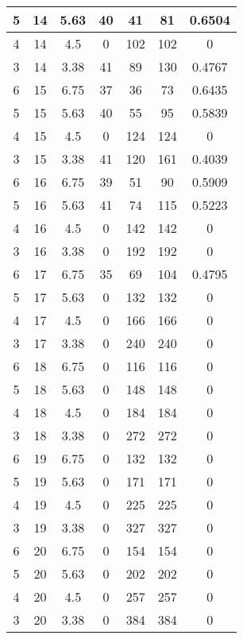 \documentclass[letterpaper, 12pt]{article}
\begin{document}
\begin{longtable}{|c|c|c|c|c|c|c|}
\hline
5 & 14 & 5.63 & 40 & 41 & 81 & 0.6504 \\
\hline
4 & 14 & 4.5 & 0 & 102 & 102 & 0 \\
\hline
3 & 14 & 3.38 & 41 & 89 & 130 & 0.4767 \\
\hline
6 & 15 & 6.75 & 37 & 36 & 73 & 0.6435 \\
\hline
5 & 15 & 5.63 & 40 & 55 & 95 & 0.5839 \\
\hline
4 & 15 & 4.5 & 0 & 124 & 124 & 0 \\
\hline
3 & 15 & 3.38 & 41 & 120 & 161 & 0.4039 \\
\hline
6 & 16 & 6.75 & 39 & 51 & 90 & 0.5909 \\
\hline
5 & 16 & 5.63 & 41 & 74 & 115 & 0.5223 \\
\hline
4 & 16 & 4.5 & 0 & 142 & 142 & 0 \\
\hline
3 & 16 & 3.38 & 0 & 192 & 192 & 0 \\
\hline
6 & 17 & 6.75 & 35 & 69 & 104 & 0.4795 \\
\hline
5 & 17 & 5.63 & 0 & 132 & 132 & 0 \\
\hline
4 & 17 & 4.5 & 0 & 166 & 166 & 0 \\
\hline
3 & 17 & 3.38 & 0 & 240 & 240 & 0 \\
\hline
6 & 18 & 6.75 & 0 & 116 & 116 & 0 \\
\hline
5 & 18 & 5.63 & 0 & 148 & 148 & 0 \\
\hline
4 & 18 & 4.5 & 0 & 184 & 184 & 0 \\
\hline
3 & 18 & 3.38 & 0 & 272 & 272 & 0 \\
\hline
6 & 19 & 6.75 & 0 & 132 & 132 & 0 \\
\hline
5 & 19 & 5.63 & 0 & 171 & 171 & 0 \\
\hline
4 & 19 & 4.5 & 0 & 225 & 225 & 0 \\
\hline
3 & 19 & 3.38 & 0 & 327 & 327 & 0 \\
\hline
6 & 20 & 6.75 & 0 & 154 & 154 & 0 \\
\hline
5 & 20 & 5.63 & 0 & 202 & 202 & 0 \\
\hline
4 & 20 & 4.5 & 0 & 257 & 257 & 0 \\
\hline
3 & 20 & 3.38 & 0 & 384 & 384 & 0 \\
\hline
\end{longtable}
\end{document}
